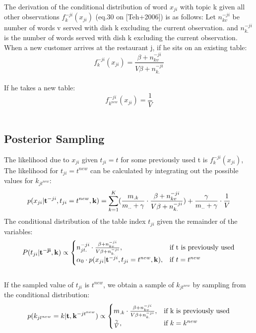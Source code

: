 \documentclass[11pt]{article}
\begin{document}
\begin{spacing}{1.6}
\noindent The derivation of the conditional distribution of word $x_{ji} $ with topic k given all other observations $f^{-ji}_k(x_{ji})$ (eq.30 on [Teh+2006]) is as follows: Let $n^{-ji}_{kv}$ be number of words v served with dish k excluding the current observation. and $n^{-ji}_{k.}$ is the number of words served with dish k excluding the current observation.\\

\noindent When a new customer arrives at the restaurant j, if he sits on an existing table:
\begin{equation}
f^{-ji}_k(x_{ji})=\frac{\beta+n^{-ji}_{kv}}{V\beta+n^{-ji}_{k.}}
\end{equation}\\
If he takes a new table:
\begin{equation}
f^{-ji}_{k^{new}}(x_{ji})=\frac{1}{V}
\end{equation}\\

\subsection{Posterior Sampling}
\noindent The likelihood due to $x_{ji}$ given $t_{ji}=t$ for some previously used t is $f^{-ji}_k(x_{ji})$, The likelihood for $t_{ji}=t^{new}$ can be calculated by integrating out the possible values for $k_{jt^{new}}$:
\begin{equation}
p(x_{ji}| {\bf{t}}^{-ji},t_{ji}=t^{new},{\bf{k}})=\sum^{K}_{k=1}( \frac{m_{.k}}{m_{..}+\gamma} \cdot \frac{\beta+n^{-ji}_{kv}}{V\beta+n^{-ji}_{k.}}) + \frac{\gamma}{m_{..}+\gamma} \cdot \frac{1}{V}
\end{equation}
The conditional distribution of the table index $t_{ji}$ given the remainder of the variables:
\begin{equation}
    P(t_{ji} | \bf{t}^{-ji}, \bf{k}) \propto
    \begin{cases}
      n^{-ji}_{jt.} \cdot \frac{\beta+n^{-ji}_{kv}}{V\beta+n^{-ji}_{k.}}, & \text{if t is previously used} \\
      \alpha_0 \cdot p(x_{ji}| {\bf{t}}^{-ji},t_{ji}=t^{new},{\bf{k}}) , & \text{if}\ t=t^{new}
    \end{cases}
\end{equation}\\

\noindent If the sampled value of $t_{ji}$ is $t^{new}$, we obtain a sample of $k_{jt^{new}}$ by sampling from the conditional distribution:
\begin{equation}
p(k_{jt^{new}}=k|{\bf{t}},{\bf{k}}^{-jt^{new}}) \propto
    \begin{cases}
      m_{.k} \cdot \frac{\beta+n^{-ji}_{kv}}{V\beta+n^{-ji}_{k.}}, & \text{if k is previously used} \\
      \frac{\gamma}{V}, &\text{if}\ k=k^{new}
    \end{cases}
\end{equation}


\end{spacing}
\end{document}
